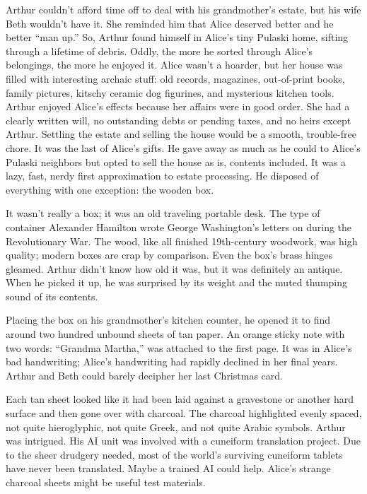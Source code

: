 Arthur couldn't afford time off to deal with his grandmother's estate,
but his wife Beth wouldn't have it. She reminded him that Alice deserved
better and he better ``man up.'' So, Arthur found himself in Alice's
tiny Pulaski home, sifting through a lifetime of debris. Oddly, the more
he sorted through Alice's belongings, the more he enjoyed it. Alice
wasn't a hoarder, but her house was filled with interesting archaic
stuff: old records, magazines, out-of-print books, family pictures,
kitschy ceramic dog figurines, and mysterious kitchen tools. Arthur
enjoyed Alice's effects because her affairs were in good order. She had
a clearly written will, no outstanding debts or pending taxes, and no
heirs except Arthur. Settling the estate and selling the house would be
a smooth, trouble-free chore. It was the last of Alice's gifts. He gave
away as much as he could to Alice's Pulaski neighbors but opted to sell
the house as is, contents included. It was a lazy, fast, nerdy first
approximation to estate processing. He disposed of everything with one
exception: the wooden box.

It wasn't really a box; it was an old traveling portable desk. The type
of container Alexander Hamilton wrote George Washington's letters on
during the Revolutionary War. The wood, like all finished 19th-century
woodwork, was high quality; modern boxes are crap by comparison. Even
the box's brass hinges gleamed. Arthur didn't know how old it was, but
it was definitely an antique. When he picked it up, he was surprised by
its weight and the muted thumping sound of its contents.

Placing the box on his grandmother's kitchen counter, he opened it to
find around two hundred unbound sheets of tan paper. An orange sticky
note with two words: ``Grandma Martha,'' was attached to the first page.
It was in Alice's bad handwriting; Alice's handwriting had rapidly
declined in her final years. Arthur and Beth could barely decipher her
last Christmas card.

Each tan sheet looked like it had been laid against a gravestone or
another hard surface and then gone over with charcoal. The charcoal
highlighted evenly spaced, not quite hieroglyphic, not quite Greek, and
not quite Arabic symbols. Arthur was intrigued. His AI unit was involved
with a cuneiform translation project. Due to the sheer drudgery needed,
most of the world's surviving cuneiform tablets have never been
translated. Maybe a trained AI could help. Alice's strange charcoal
sheets might be useful test materials.

